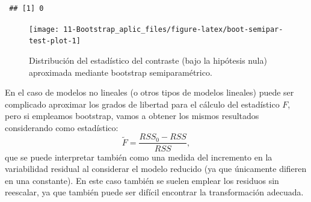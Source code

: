 \documentclass[
  10pt,
]{book}
\newenvironment{Shaded}{\begin{snugshade}}{\end{snugshade}}
\newcommand{\AttributeTok}[1]{\textcolor[rgb]{0.77,0.63,0.00}{#1}}
\newcommand{\ConstantTok}[1]{\textcolor[rgb]{0.00,0.00,0.00}{#1}}
\newcommand{\DecValTok}[1]{\textcolor[rgb]{0.00,0.00,0.81}{#1}}
\newcommand{\FunctionTok}[1]{\textcolor[rgb]{0.00,0.00,0.00}{#1}}
\newcommand{\NormalTok}[1]{#1}
\newcommand{\OtherTok}[1]{\textcolor[rgb]{0.56,0.35,0.01}{#1}}
\newcommand{\SpecialCharTok}[1]{\textcolor[rgb]{0.00,0.00,0.00}{#1}}
\newcommand{\StringTok}[1]{\textcolor[rgb]{0.31,0.60,0.02}{#1}}
\theoremstyle{break}
\theoremstyle{nonumberplain}
\begin{document}
\begin{Shaded}
\end{Shaded}

\begin{verbatim}
 ## [1] 0
\end{verbatim}

\begin{figure}[!htbp]

{\centering \texttt{[image: 11-Bootstrap\_aplic\_files/figure-latex/boot-semipar-test-plot-1]} 

}

\caption{Distribución del estadístico del contraste (bajo la hipótesis nula) aproximada mediante bootstrap semiparamétrico.}\label{fig:boot-semipar-test-plot}
\end{figure}

En el caso de modelos no lineales (o otros tipos de modelos lineales) puede ser
complicado aproximar los grados de libertad para el cálculo del estadístico \(F\),
pero si empleamos bootstrap, vamos a obtener los mismos resultados considerando
como estadístico:
\[\tilde F =\frac{RSS_0 - RSS}{RSS},\]
que se puede interpretar también como una medida del incremento en la variabilidad residual
al considerar el modelo reducido (ya que únicamente difieren en una constante).
En este caso también se suelen emplear los residuos sin reescalar, ya que también puede ser
difícil encontrar la transformación adecuada.
\end{document}
